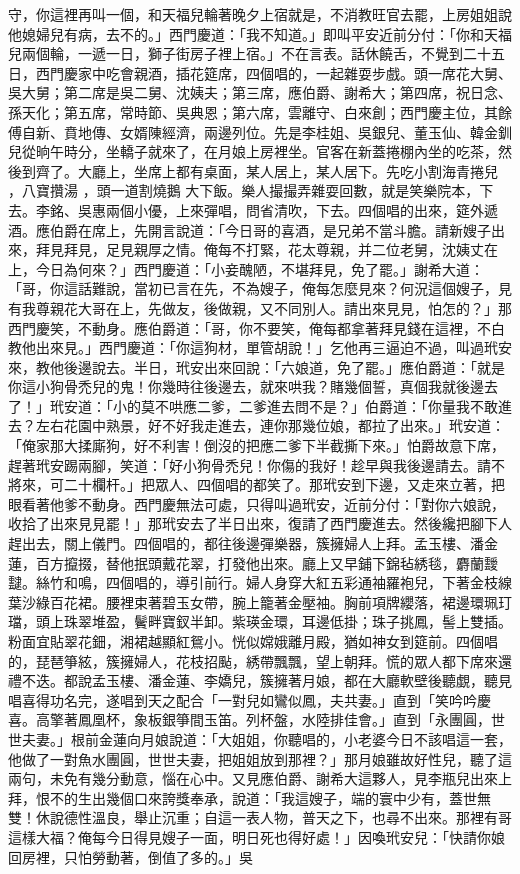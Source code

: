 守，你這裡再叫一個，和天福兒輪著晚夕上宿就是，不消教旺官去罷，上房姐姐說他媳婦兒有病，去不的。」西門慶道：「我不知道。」即叫平安近前分付：「你和天福兒兩個輪，一遞一日，獅子街房子裡上宿。」不在言表。話休饒舌，不覺到二十五日，西門慶家中吃會親酒，插花筵席，四個唱的，一起雜耍步戲。頭一席花大舅、吳大舅；第二席是吳二舅、沈姨夫；第三席，應伯爵、謝希大；第四席，祝日念、孫天化；第五席，常時節、吳典恩；第六席，雲離守、白來創；西門慶主位，其餘傅自新、賁地傳、女婿陳經濟，兩邊列位。先是李桂姐、吳銀兒、董玉仙、韓金釧兒從晌午時分，坐轎子就來了，在月娘上房裡坐。官客在新蓋捲棚內坐的吃茶，然後到齊了。大廳上，坐席上都有桌面，某人居上，某人居下。先吃小割海青捲兒 ，八寶攢湯 ，頭一道割燒鵝 大下飯。樂人撮撮弄雜耍回數，就是笑樂院本，下去。李銘、吳惠兩個小優，上來彈唱，問省清吹，下去。四個唱的出來，筵外遞酒。應伯爵在席上，先開言說道：「今日哥的喜酒，是兄弟不當斗膽。請新嫂子出來，拜見拜見，足見親厚之情。俺每不打緊，花太尊親，并二位老舅，沈姨丈在上，今日為何來？」西門慶道：「小妾醜陋，不堪拜見，免了罷。」謝希大道：「哥，你這話難說，當初已言在先，不為嫂子，俺每怎麼見來？何況這個嫂子，見有我尊親花大哥在上，先做友，後做親，又不同別人。請出來見見，怕怎的？」那西門慶笑，不動身。應伯爵道：「哥，你不要笑，俺每都拿著拜見錢在這裡，不白教他出來見。」西門慶道：「你這狗材，單管胡說！」乞他再三逼迫不過，叫過玳安來，教他後邊說去。半日，玳安出來回說：「六娘道，免了罷。」應伯爵道：「就是你這小狗骨禿兒的鬼！你幾時往後邊去，就來哄我？賭幾個誓，真個我就後邊去了！」玳安道：「小的莫不哄應二爹，二爹進去問不是？」伯爵道：「你量我不敢進去？左右花園中熟景，好不好我走進去，連你那幾位娘，都拉了出來。」玳安道：「俺家那大揉廝狗，好不利害！倒沒的把應二爹下半截撕下來。」怕爵故意下席，趕著玳安踢兩腳，笑道：「好小狗骨禿兒！你傷的我好！趁早與我後邊請去。請不將來，可二十欄杆。」把眾人、四個唱的都笑了。那玳安到下邊，又走來立著，把眼看著他爹不動身。西門慶無法可處，只得叫過玳安，近前分付：「對你六娘說，收拾了出來見見罷！」那玳安去了半日出來，復請了西門慶進去。然後纔把腳下人趕出去，關上儀門。四個唱的，都往後邊彈樂器，簇擁婦人上拜。孟玉樓、潘金蓮，百方攛掇，替他抿頭戴花翠，打發他出來。廳上又早鋪下錦毡綉毯，麝蘭靉靆。絲竹和鳴，四個唱的，導引前行。婦人身穿大紅五彩通袖羅袍兒，下著金枝線葉沙綠百花裙。腰裡束著碧玉女帶，腕上籠著金壓袖。胸前項牌纓落，裙邊環珮玎璫，頭上珠翠堆盈，鬢畔寶釵半卸。紫瑛金環，耳邊低掛；珠子挑鳳，髻上雙插。粉面宜貼翠花鈿，湘裙越顯紅鴛小。恍似嫦娥離月殿，猶如神女到筵前。四個唱的，琵琶箏絃，簇擁婦人，花枝招颭，綉帶飄飄，望上朝拜。慌的眾人都下席來還禮不迭。都說孟玉樓、潘金蓮、李嬌兒，簇擁著月娘，都在大廳軟壁後聽覷，聽見唱喜得功名完，遂唱到天之配合「一對兒如鸞似鳳，夫共妻。」直到「笑吟吟慶喜。高擎著鳳凰杯，象板銀箏間玉笛。列杯盤，水陸排佳會。」直到「永團圓，世世夫妻。」根前金蓮向月娘說道：「大姐姐，你聽唱的，小老婆今日不該唱這一套，他做了一對魚水團圓，世世夫妻，把姐姐放到那裡？」那月娘雖故好性兒，聽了這兩句，未免有幾分動意，惱在心中。又見應伯爵、謝希大這夥人，見李瓶兒出來上拜，恨不的生出幾個口來誇獎奉承，說道：「我這嫂子，端的寰中少有，蓋世無雙！休說德性溫良，舉止沉重；自這一表人物，普天之下，也尋不出來。那裡有哥這樣大福？俺每今日得見嫂子一面，明日死也得好處！」因喚玳安兒：「快請你娘回房裡，只怕勞動著，倒值了多的。」吳